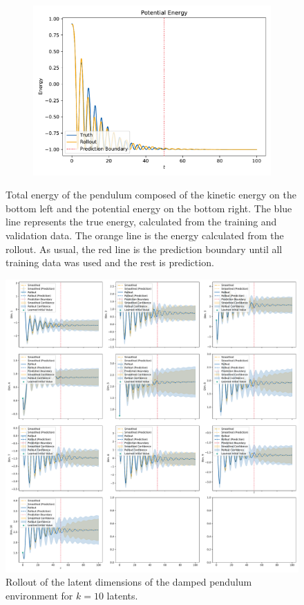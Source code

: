 \begin{figure}
\begin{subfigure}{0.5\linewidth}
				\includegraphics[width=\linewidth]{figures/results/pendulum-damped/run-latent-dim-10/energy-R110-N0-potential.pdf}
			\end{subfigure}
			\caption{Total energy of the pendulum composed of the kinetic energy on the bottom left and the potential energy on the bottom right. The blue line represents the true energy, calculated from the training and validation data. The orange line is the energy calculated from the rollout. As usual, the red line is the prediction boundary until all training data was used and the rest is prediction.}
			\label{fig:pendulumDampedEnergyL10}
		\end{figure}

		\begin{figure}
			\centering
			\includegraphics[width=\linewidth]{figures/results/pendulum-damped/run-latent-dim-10/rollout-latents-N0.pdf}
			\caption{Rollout of the latent dimensions of the damped pendulum environment for \(k = 10 \) latents.}
			\label{fig:pendulumDampedLatentRolloutL10}
		\end{figure}

